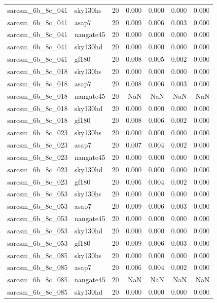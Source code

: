 \begin{tabular}{llrrrrr}
sarcsm\_6b\_8c\_041 & sky130hs & 20 & 0.000 & 0.000 & 0.000 & 0.000 \\
sarcsm\_6b\_8c\_041 & asap7 & 20 & 0.009 & 0.006 & 0.003 & 0.000 \\
sarcsm\_6b\_8c\_041 & nangate45 & 20 & 0.000 & 0.000 & 0.000 & 0.000 \\
sarcsm\_6b\_8c\_041 & sky130hd & 20 & 0.000 & 0.000 & 0.000 & 0.000 \\
sarcsm\_6b\_8c\_041 & gf180 & 20 & 0.008 & 0.005 & 0.002 & 0.000 \\
sarcsm\_6b\_8c\_018 & sky130hs & 20 & 0.000 & 0.000 & 0.000 & 0.000 \\
sarcsm\_6b\_8c\_018 & asap7 & 20 & 0.008 & 0.006 & 0.003 & 0.000 \\
sarcsm\_6b\_8c\_018 & nangate45 & 20 & NaN & NaN & NaN & NaN \\
sarcsm\_6b\_8c\_018 & sky130hd & 20 & 0.000 & 0.000 & 0.000 & 0.000 \\
sarcsm\_6b\_8c\_018 & gf180 & 20 & 0.008 & 0.006 & 0.002 & 0.000 \\
sarcsm\_6b\_8c\_023 & sky130hs & 20 & 0.000 & 0.000 & 0.000 & 0.000 \\
sarcsm\_6b\_8c\_023 & asap7 & 20 & 0.007 & 0.004 & 0.002 & 0.000 \\
sarcsm\_6b\_8c\_023 & nangate45 & 20 & 0.000 & 0.000 & 0.000 & 0.000 \\
sarcsm\_6b\_8c\_023 & sky130hd & 20 & 0.000 & 0.000 & 0.000 & 0.000 \\
sarcsm\_6b\_8c\_023 & gf180 & 20 & 0.006 & 0.004 & 0.002 & 0.000 \\
sarcsm\_6b\_8c\_053 & sky130hs & 20 & 0.000 & 0.000 & 0.000 & 0.000 \\
sarcsm\_6b\_8c\_053 & asap7 & 20 & 0.009 & 0.006 & 0.003 & 0.000 \\
sarcsm\_6b\_8c\_053 & nangate45 & 20 & 0.000 & 0.000 & 0.000 & 0.000 \\
sarcsm\_6b\_8c\_053 & sky130hd & 20 & 0.000 & 0.000 & 0.000 & 0.000 \\
sarcsm\_6b\_8c\_053 & gf180 & 20 & 0.009 & 0.006 & 0.003 & 0.000 \\
sarcsm\_6b\_8c\_085 & sky130hs & 20 & 0.000 & 0.000 & 0.000 & 0.000 \\
sarcsm\_6b\_8c\_085 & asap7 & 20 & 0.006 & 0.004 & 0.002 & 0.000 \\
sarcsm\_6b\_8c\_085 & nangate45 & 20 & NaN & NaN & NaN & NaN \\
sarcsm\_6b\_8c\_085 & sky130hd & 20 & 0.000 & 0.000 & 0.000 & 0.000 \\

\end{tabular}
